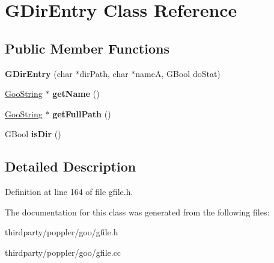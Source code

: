 \hypertarget{class_g_dir_entry}{}\section{G\+Dir\+Entry Class Reference}
\label{class_g_dir_entry}
\subsection*{Public Member Functions}
\begin{DoxyCompactItemize}
\item 
\mbox{\label{class_g_dir_entry_af2b4d8c80250346b184f8292c268b9b8}} 
{\bfseries G\+Dir\+Entry} (char $\ast$dir\+Path, char $\ast$nameA, G\+Bool do\+Stat)
\item 
\mbox{\label{class_g_dir_entry_ab566b96cae75705be0e2e4daf3da5fd2}} 
\hyperlink{class_goo_string}{Goo\+String} $\ast$ {\bfseries get\+Name} ()
\item 
\mbox{\label{class_g_dir_entry_ac7d97a2bbfa5c60560ab31492ac817b8}} 
\hyperlink{class_goo_string}{Goo\+String} $\ast$ {\bfseries get\+Full\+Path} ()
\item 
\mbox{\label{class_g_dir_entry_a99a33f18bdb0027f0e85417ab3e12e8f}} 
G\+Bool {\bfseries is\+Dir} ()
\end{DoxyCompactItemize}


\subsection{Detailed Description}


Definition at line 164 of file gfile.\+h.



The documentation for this class was generated from the following files\+:\begin{DoxyCompactItemize}
\item 
thirdparty/poppler/goo/gfile.\+h\item 
thirdparty/poppler/goo/gfile.\+cc\end{DoxyCompactItemize}
